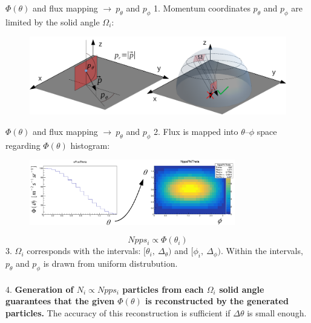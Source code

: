 \documentclass{beamer}
\begin{document}
\begin{frame}{$\Phi(\theta)$ and flux mapping  $\rightarrow ~ p_\theta$ and $p_\phi$}
1. Momentum coordinates $p_\theta$ and $p_\phi$ are limited by the solid angle $\Omega_i$:
\begin{figure}
\includegraphics[width=1.02\textwidth]{images/p_spherical.png}%
\end{figure}
\end{frame}

\begin{frame}{$\Phi(\theta)$ and flux mapping  $\rightarrow ~ p_\theta$ and $p_\phi$}
2. Flux is mapped into $\theta$--$\phi$ space regarding $\Phi(\theta)$ histogram:
\begin{figure}
\includegraphics[width=0.8\textwidth]{images/Phi_theta_fluxmap.png}%
\end{figure}
\[
Npps_i \propto \Phi(\theta_i)
\]
3. $\Omega_i$ corresponds with the intervals: $[\theta_i,~\Delta_\theta)$ and $[\phi_i,~\Delta_\phi)$. Within the intervals,
$p_\theta$ and $p_\phi$ is drawn from uniform distrubution. \\~\\

4. \textbf{Generation of $N_i \propto Npps_i$ particles from each $\Omega_i$ solid angle guarantees that the given $\Phi(\theta)$  is reconstructed by the generated particles.} The accuracy of this reconstruction is sufficient if $\Delta \theta$ is small enough.
\end{frame}
\end{document}

